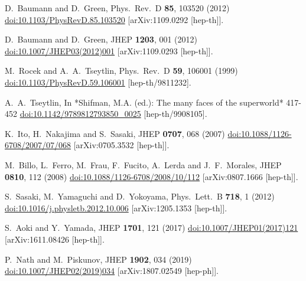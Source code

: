 \documentclass[12pt]{article}
\begin{document}
\begin{thebibliography}{99}
  D.~Baumann and D.~Green,
  Phys.\ Rev.\ D {\bf 85}, 103520 (2012)
  \href{https://dx.doi.org/10.1103/PhysRevD.85.103520}{doi:10.1103/PhysRevD.85.103520}
  [arXiv:1109.0292 [hep-th]].

  D.~Baumann and D.~Green,
  JHEP {\bf 1203}, 001 (2012)
  \href{https://dx.doi.org/10.1007/JHEP03(2012)001}{doi:10.1007/JHEP03(2012)001}
  [arXiv:1109.0293 [hep-th]].

  M.~Rocek and A.~A.~Tseytlin,
  Phys.\ Rev.\ D {\bf 59}, 106001 (1999)
  \href{https://dx.doi.org/10.1103/PhysRevD.59.106001}{doi:10.1103/PhysRevD.59.106001}
  [hep-th/9811232].

  A.~A.~Tseytlin,
  In *Shifman, M.A. (ed.): The many faces of the superworld* 417-452
  \href{https://dx.doi.org/10.1142/9789812793850\_0025}{doi:10.1142/9789812793850\_0025}
  [hep-th/9908105].

  K.~Ito, H.~Nakajima and S.~Sasaki,
  JHEP {\bf 0707}, 068 (2007)
  \href{https://dx.doi.org/10.1088/1126-6708/2007/07/068}{doi:10.1088/1126-6708/2007/07/068}
  [arXiv:0705.3532 [hep-th]].

  M.~Billo, L.~Ferro, M.~Frau, F.~Fucito, A.~Lerda and J.~F.~Morales,
  JHEP {\bf 0810}, 112 (2008)
  \href{https://dx.doi.org/10.1088/1126-6708/2008/10/112}{doi:10.1088/1126-6708/2008/10/112}
  [arXiv:0807.1666 [hep-th]].

  S.~Sasaki, M.~Yamaguchi and D.~Yokoyama,
  Phys.\ Lett.\ B {\bf 718}, 1 (2012)
  \href{https://dx.doi.org/10.1016/j.physletb.2012.10.006}{doi:10.1016/j.physletb.2012.10.006}
  [arXiv:1205.1353 [hep-th]].

  S.~Aoki and Y.~Yamada,
  JHEP {\bf 1701}, 121 (2017)
  \href{https://dx.doi.org/10.1007/JHEP01(2017)121}{doi:10.1007/JHEP01(2017)121}
  [arXiv:1611.08426 [hep-th]].

  P.~Nath and M.~Piskunov,
  JHEP {\bf 1902}, 034 (2019)
  \href{https://dx.doi.org/10.1007/JHEP02(2019)034}{doi:10.1007/JHEP02(2019)034}
  [arXiv:1807.02549 [hep-ph]].


\end{thebibliography}
\end{document}
